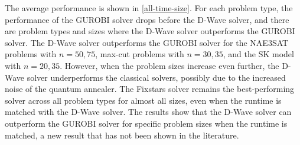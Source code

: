 \begin{table}[!htb]
    \centering
    \caption{Average runtime (seconds) of the D-Wave solver by problem type and size. Dashes indicate that the D-Wave solver could not embed problems of that size.}
    \label{results:averageruntimedwave}
\end{table}

The average performance is shown in \autoref{all-time-size}. For each problem type, the performance of the GUROBI solver drops before the D-Wave solver, and there are problem types and sizes where the D-Wave solver outperforms the GUROBI solver. The D-Wave solver outperforms the GUROBI solver for the NAE3SAT problems with $n=50, 75$, max-cut problems with $n=30, 35$, and the SK model with $n=20, 35$. However, when the problem sizes increase even further, the D-Wave solver underperforms the classical solvers, possibly due to the increased noise of the quantum annealer. The Fixstars solver remains the best-performing solver across all problem types for almost all sizes, even when the runtime is matched with the D-Wave solver. The results show that the D-Wave solver can outperform the GUROBI solver for specific problem sizes when the runtime is matched, a new result that has not been shown in the literature. 

